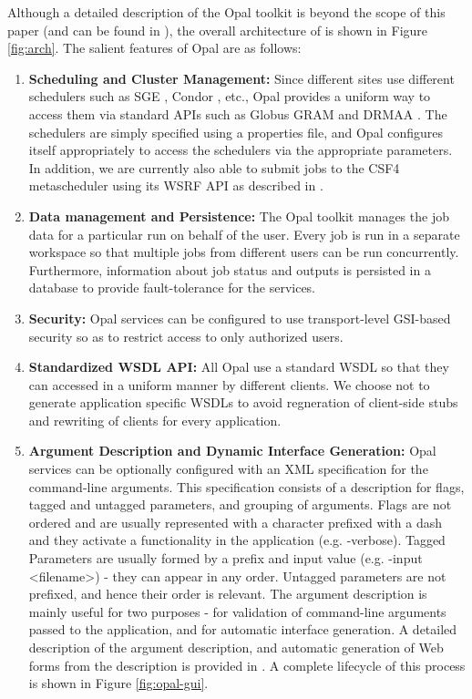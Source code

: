 \documentclass[conference]{IEEEtran}
\begin{document}
Although a detailed description of the Opal toolkit is beyond the scope of
this paper (and can be found in \cite{opal}), the overall architecture of
is shown in Figure \ref{fig:arch}. The salient features of Opal are as
follows:

\begin{enumerate}
\item{{\bf Scheduling and Cluster Management:} Since different sites use
    different schedulers such as SGE \cite{sge}, Condor \cite{condor},
    etc., Opal provides a uniform way to access them via standard APIs such
    as Globus GRAM \cite{gram} and DRMAA \cite{drmaa}. The schedulers are
    simply specified using a properties file, and Opal configures itself
    appropriately to access the schedulers via the appropriate parameters.
    In addition, we are currently also able to submit jobs to the CSF4
    metascheduler \cite{csf4} using its WSRF API \cite{wsrf} as described
    in \cite{opal-gui}.}

\item{{\bf Data management and Persistence:} The Opal toolkit manages the
    job data for a particular run on behalf of the user. Every job is run
    in a separate workspace so that multiple jobs from different users can
    be run concurrently. Furthermore, information about job status and
    outputs is persisted in a database to provide fault-tolerance for the
    services.}

\item{{\bf Security:} Opal services can be configured to use
    transport-level GSI-based \cite{gsi} security so as to restrict access
    to only authorized users.}

\item{{\bf Standardized WSDL API:} All Opal use a standard WSDL so that
    they can accessed in a uniform manner by different clients. We choose
    not to generate application specific WSDLs to avoid regneration of
    client-side stubs and rewriting of clients for every application.}

\item{{\bf Argument Description and Dynamic Interface Generation:} Opal
    services can be optionally configured with an XML specification for the
    command-line arguments. This specification consists of a description
    for flags, tagged and untagged parameters, and grouping of arguments.
    Flags are not ordered and are usually represented with a character
    prefixed with a dash and they activate a functionality in the
    application (e.g. -verbose). Tagged Parameters are usually formed by a
    prefix and input value (e.g. -input <filename>) - they can appear in
    any order. Untagged parameters are not prefixed, and hence their order
    is relevant. The argument description is mainly useful for two purposes
    - for validation of command-line arguments passed to the application,
    and for automatic interface generation. A detailed description of the
    argument description, and automatic generation of Web forms from the
    description is provided in \cite{opal-gui}. A complete lifecycle of
    this process is shown in Figure \ref{fig:opal-gui}.}

\end{enumerate}
\end{document}
